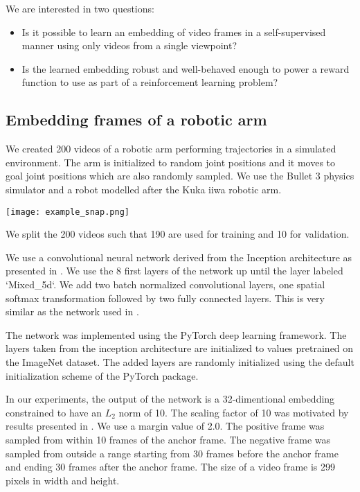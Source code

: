 
We are interested in two questions:
\begin{itemize}
\item Is it possible to learn an embedding of video frames in a self-supervised manner using only videos from a single viewpoint?
\item Is the learned embedding robust and well-behaved enough to power a reward function to use as part of a reinforcement learning problem?
\end{itemize}

\subsection{Embedding frames of a robotic arm}

We created 200 videos of a robotic arm performing trajectories in a simulated environment. The arm is initialized to random joint positions and it moves to goal joint positions which are also randomly sampled. We use the Bullet 3 physics simulator and a robot modelled after the Kuka iiwa robotic arm.

{
    \label{example-snap}
    \centering
    \texttt{[image: example\_snap.png]}
    \vspace{0.5cm}
}

We split the 200 videos such that 190 are used for training and 10 for validation.

We use a convolutional neural network derived from the Inception architecture as presented in \citep{inception-v3}. We use the 8 first layers of the network up until the layer labeled `Mixed\_5d`. We add two batch normalized convolutional layers, one spatial softmax transformation followed by two fully connected layers. This is very similar as the network used in \cite{self-supervised-learning}.

The network was implemented using the PyTorch deep learning framework. The layers taken from the inception architecture are initialized to values pretrained on the ImageNet dataset. The added layers are randomly initialized using the default initialization scheme of the PyTorch package.

In our experiments, the output of the network is a 32-dimentional embedding constrained to have an $L_2$ norm of 10. The scaling factor of 10 was motivated by results presented in \cite{constrained-softmax-loss}. We use a margin value of 2.0. The positive frame was sampled from within 10 frames of the anchor frame. The negative frame was sampled from outside a range starting from 30 frames before the anchor frame and ending 30 frames after the anchor frame. The size of a video frame is 299 pixels in width and height.

